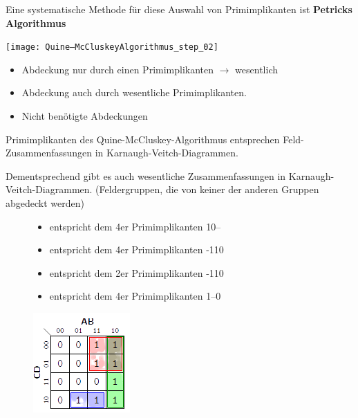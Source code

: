 \documentclass[12pt]{report}
\begin{document}
\begin{enumerate}
\begin{itemize}
                Eine systematische Methode für diese Auswahl von Primimplikanten ist \textbf{Petricks Algorithmus}
        \end{itemize}
        \begin{center}
          \texttt{[image: Quine–McCluskeyAlgorithmus\_step\_02]}
        \end{center}

        \begin{itemize}
          \item[\color{red} $\bullet$ ] Abdeckung nur durch einen Primimplikanten $\rightarrow$ wesentlich
          \item[\color{blue} $\bullet$ ] Abdeckung auch durch wesentliche Primimplikanten.
          \item[\color{gray} $\bullet$ ] Nicht benötigte Abdeckungen
        \end{itemize}
\end{enumerate}


\begin{infobox}
  Primimplikanten des Quine-McCluskey-Algorithmus entsprechen 
  Feld-Zusammenfassungen in Karnaugh-Veitch-Diagrammen.

  Dementsprechend gibt es auch wesentliche Zusammenfassungen in Karnaugh-Veitch-Diagrammen. 
  (Feldergruppen, die von keiner der anderen Gruppen abgedeckt werden)
\end{infobox}
\begin{figure}[h]
  \begin{minipage}{0.6\textwidth}
    \begin{itemize}
      \item[\color{green} Grün] entspricht dem 4er Primimplikanten 10--
      \item[\color{red} Rot\ ] entspricht dem 4er Primimplikanten -110
      \item[\color{blue} Blau] entspricht dem 2er Primimplikanten -110
      \item[\color{yellow} Gelb] entspricht dem 4er Primimplikanten 1--0
    \end{itemize}
  \end{minipage}
  \hfill
  \begin{minipage}{0.4\textwidth}
    \includegraphics{karnaugh-veitch-step_03}
  \end{minipage}
\end{figure}
\end{document}
